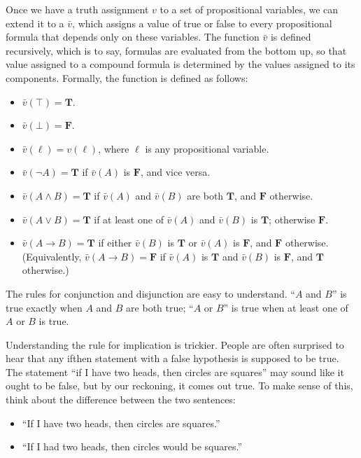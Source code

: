 \documentclass[letterpaper,10pt,english]{sphinxmanual}
\begin{document}
\sphinxAtStartPar
Once we have a truth assignment \(v\) to a set of propositional variables, we can extend it to a  \(\bar v\), which assigns a value of true or false to every propositional formula that depends only on these variables. The function \(\bar v\) is defined recursively, which is to say, formulas are evaluated from the bottom up, so that value assigned to a compound formula is determined by the values assigned to its components. Formally, the function is defined as follows:
\begin{itemize}
\item {} 
\sphinxAtStartPar
\(\bar v(\top) = \mathbf{T}\).

\item {} 
\sphinxAtStartPar
\(\bar v(\bot) = \mathbf{F}\).

\item {} 
\sphinxAtStartPar
\(\bar v(\ell) = v(\ell)\), where \(\ell\) is any propositional variable.

\item {} 
\sphinxAtStartPar
\(\bar v(\neg A) = \mathbf{T}\) if \(\bar v(A)\) is \(\mathbf{F}\), and vice versa.

\item {} 
\sphinxAtStartPar
\(\bar v(A \wedge B) = \mathbf{T}\) if \(\bar v(A)\) and \(\bar v(B)\) are both \(\mathbf{T}\), and \(\mathbf{F}\) otherwise.

\item {} 
\sphinxAtStartPar
\(\bar v(A \vee B) = \mathbf{T}\) if at least one of \(\bar v(A)\) and \(\bar v(B)\) is \(\mathbf{T}\); otherwise \(\mathbf{F}\).

\item {} 
\sphinxAtStartPar
\(\bar v(A \to B) = \mathbf{T}\) if either \(\bar v(B)\) is \(\mathbf{T}\) or \(\bar v(A)\) is \(\mathbf{F}\), and \(\mathbf{F}\) otherwise. (Equivalently, \(\bar v(A \to B) = \mathbf{F}\) if \(\bar v(A)\) is \(\mathbf{T}\) and \(\bar v(B)\) is \(\mathbf{F}\), and \(\mathbf{T}\) otherwise.)

\end{itemize}

\sphinxAtStartPar
The rules for conjunction and disjunction are easy to understand. “\(A\) and \(B\)” is true exactly when \(A\) and \(B\) are both true; “\(A\) or \(B\)” is true when at least one of \(A\) or \(B\) is true.

\sphinxAtStartPar
Understanding the rule for implication is trickier. People are often surprised to hear that any if\sphinxhyphen{}then statement with a false hypothesis is supposed to be true. The statement “if I have two heads, then circles are squares” may sound like it ought to be false, but by our reckoning, it comes out true. To make sense of this, think about the difference between the two sentences:
\begin{itemize}
\item {} 
\sphinxAtStartPar
“If I have two heads, then circles are squares.”

\item {} 
\sphinxAtStartPar
“If I had two heads, then circles would be squares.”

\end{itemize}
\end{document}
